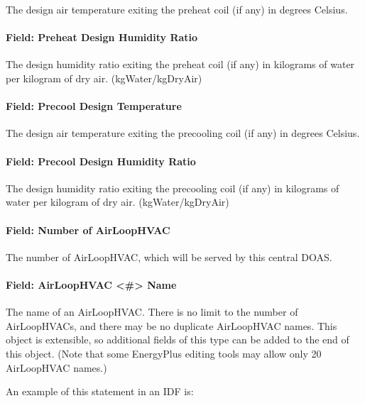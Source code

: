 The design air temperature exiting the preheat coil (if any) in degrees Celsius.

\paragraph{Field: Preheat Design Humidity Ratio}

The design humidity ratio exiting the preheat coil (if any) in kilograms of water per kilogram of dry air. (kgWater/kgDryAir)

\paragraph{Field: Precool Design Temperature}

The design air temperature exiting the precooling coil (if any) in degrees Celsius.

\paragraph{Field: Precool Design Humidity Ratio}

The design humidity ratio exiting the precooling coil (if any) in kilograms of water per kilogram of dry air. (kgWater/kgDryAir)

\paragraph{Field: Number of AirLoopHVAC}\label{field-number-of-airloophvac}

The number of AirLoopHVAC, which will be served by this central DOAS.

\paragraph{Field: AirLoopHVAC \textless{}\#\textgreater{} Name}\label{field-airloophvac-name}

The name of an AirLoopHVAC. There is no limit to the number of AirLoopHVACs, and there may be no duplicate AirLoopHVAC names.  This object is extensible, so additional fields of this type can be added to the end of this object.  (Note that some EnergyPlus editing tools may allow only 20 AirLoopHVAC names.)

An example of this statement in an IDF is:

